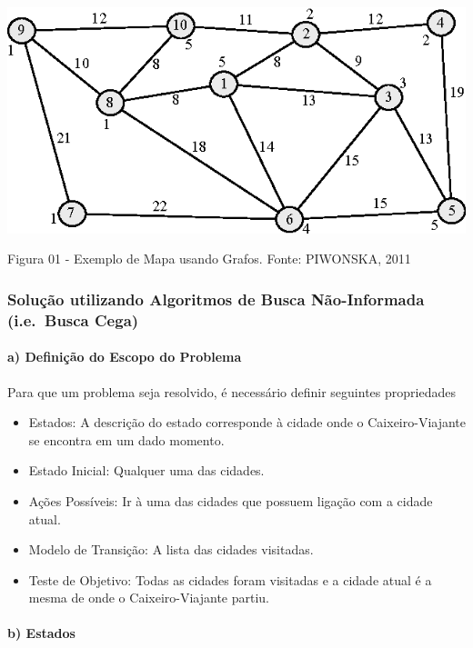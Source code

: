 \documentclass[11pt]{article}
\makeatletter
\def\maxwidth{\ifdim\Gin@nat@width>\linewidth\linewidth
    \else\Gin@nat@width\fi}
\let\Oldincludegraphics\includegraphics
\renewcommand{\includegraphics}[1]{\Oldincludegraphics[width=.8\maxwidth]{#1}}
\providecommand{\tightlist}{%
      \setlength{\itemsep}{0pt}\setlength{\parskip}{0pt}}
\makeatother
\begin{document}
\includegraphics{imgs/img1.png}

Figura 01 - Exemplo de Mapa usando Grafos. Fonte: PIWONSKA, 2011

\hypertarget{soluuxe7uxe3o-utilizando-algoritmos-de-busca-nuxe3o-informada-i.e.busca-cega}{%
\subsubsection{Solução utilizando Algoritmos de Busca Não-Informada
(i.e.~Busca
Cega)}\label{soluuxe7uxe3o-utilizando-algoritmos-de-busca-nuxe3o-informada-i.e.busca-cega}}

\hypertarget{a-definiuxe7uxe3o-do-escopo-do-problema}{%
\paragraph{a) Definição do Escopo do
Problema}\label{a-definiuxe7uxe3o-do-escopo-do-problema}}

Para que um problema seja resolvido, é necessário definir seguintes
propriedades

\begin{itemize}
\tightlist
\item
  Estados: A descrição do estado corresponde à cidade onde o
  Caixeiro-Viajante se encontra em um dado momento.
\item
  Estado Inicial: Qualquer uma das cidades.
\item
  Ações Possíveis: Ir à uma das cidades que possuem ligação com a cidade
  atual.
\item
  Modelo de Transição: A lista das cidades visitadas.
\item
  Teste de Objetivo: Todas as cidades foram visitadas e a cidade atual é
  a mesma de onde o Caixeiro-Viajante partiu.
\end{itemize}

    \hypertarget{b-estados}{%
\paragraph{b) Estados}\label{b-estados}}
\end{document}
